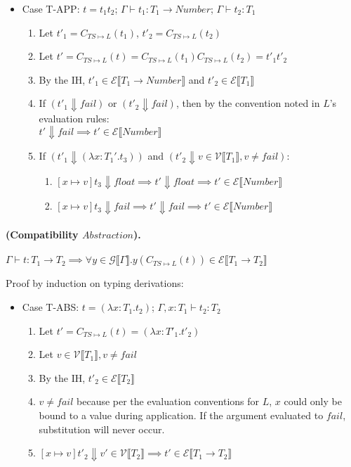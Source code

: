 \documentclass{article}
\newcommand{\denoteset}[2]{\mathcal{#1} \llbracket #2 \rrbracket}
\begin{document}
\begin{itemize}
		\item Case T-APP: $t = t_1 t_2$; $\Gamma \vdash t_1: T_1 \rightarrow Number$; $\Gamma \vdash t_2: T_1$
		\begin{enumerate}
			\item Let $t'_1 = C_{TS \mapsto L}(t_1)$, $t'_2 = C_{TS \mapsto L}(t_2)$
			\item Let $t' = C_{TS \mapsto L}(t) = C_{TS \mapsto L}(t_1) C_{TS \mapsto L}(t_2) = t'_1 t'_2$
			\item By the IH, $t'_1 \in \denoteset{E}{T_1 \rightarrow Number}$ and $t'_2 \in \denoteset{E}{T_1}$
			\item If $(t'_1 \Downarrow fail)$ or $(t'_2 \Downarrow fail)$, then by the convention noted in $L$'s evaluation rules:\\
			$t' \Downarrow fail \implies t' \in \denoteset{E}{Number}$
			\item If $(t'_1 \Downarrow (\lambda x: T_1'.t_3))$ and $(t'_2 \Downarrow v \in \denoteset{V}{T_1}, v \neq fail)$:\\
			\begin{enumerate}
				\item $[x \mapsto v]t_3 \Downarrow float \implies t' \Downarrow float \implies t' \in \denoteset{E}{Number}$
				\item $[x \mapsto v]t_3 \Downarrow fail \implies t' \Downarrow fail \implies t' \in \denoteset{E}{Number}$
			\end{enumerate}

		\end{enumerate}
	\end{itemize}

	\paragraph{(Compatibility $Abstraction$).}
	$\Gamma \vdash t: T_1 \rightarrow T_2 \implies \forall y \in \denoteset{G}{\Gamma}. y(C_{TS \mapsto L}(t)) \in \denoteset{E}{T_1 \rightarrow T_2}$

	Proof by induction on typing derivations:
	
	\begin{itemize}
		\item Case T-ABS: $t = (\lambda x: T_1.t_2)$; $\Gamma, x: T_1 \vdash t_2: T_2$
		\begin{enumerate}
			\item Let $t' = C_{TS \mapsto L}(t) = (\lambda x: T'_1.t'_2)$
			\item Let $v \in \denoteset{V}{T_1}, v \neq fail$
			\item By the IH, $t'_2 \in \denoteset{E}{T_2}$
			\item $v \neq fail$ because per the evaluation conventions for $L$, $x$ could only be bound to a value during application. If the argument evaluated to $fail$, substitution will never occur.
			\item $[x \mapsto v]t'_2 \Downarrow v' \in \denoteset{V}{T_2} \implies t' \in \denoteset{E}{T_1 \rightarrow T_2}$
		\end{enumerate}
	\end{itemize}
\end{document}
